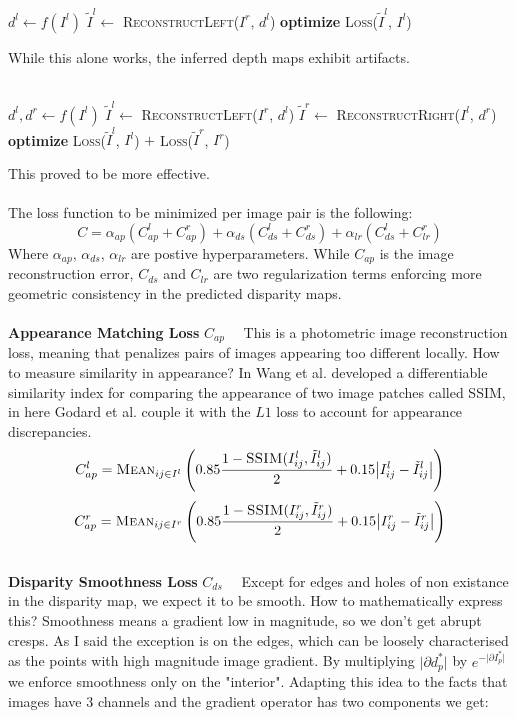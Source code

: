 \begin{algorithmic}
	\State $d^{l} \gets f(I^{l})$ 
	\State $\tilde{I}^{l} \gets$ \textsc{ReconstructLeft}($I^{r}$, $d^{l}$)
	\State \textbf{optimize} \textsc{Loss}($\tilde{I}^{l}$, $I^{l}$)
	\Statex
\end{algorithmic}

While this alone works, the inferred depth maps exhibit artifacts.\\
\\

\begin{algorithmic}
	\State $d^{l}, d^{r} \gets f(I^{l})$ 
	\State $\tilde{I}^{l} \gets$ \textsc{ReconstructLeft}($I^{r}$, $d^{l}$)
	\State $\tilde{I}^{r} \gets$ \textsc{ReconstructRight}($I^{l}$, $d^{r}$)
	\State \textbf{optimize} \textsc{Loss}($\tilde{I}^{l}$, $I^{l}$) $+$ \textsc{Loss}($\tilde{I}^{r}$, $I^{r}$)
	\Statex
\end{algorithmic}
This proved to be more effective.\\
\\
The loss function to be minimized per image pair is the following:
\[
	C = \alpha_{ap}(C_{ap}^{l} + C_{ap}^{r}) +
		\alpha_{ds}(C_{ds}^{l} + C_{ds}^{r}) +
		\alpha_{lr}(C_{ds}^{l} + C_{lr}^{r}) 
\]
Where $\alpha_{ap}$, $\alpha_{ds}$, $\alpha_{lr}$ are postive hyperparameters. While $C_{ap}$ is the image reconstruction error, $C_{ds}$ and $C_{lr}$ are two regularization terms enforcing more geometric consistency in the predicted disparity maps.\\
\\
\textbf{Appearance Matching Loss} $C_{ap} \quad$ This is a photometric image reconstruction loss, meaning that penalizes pairs of images appearing too different locally. How to measure similarity in appearance? In \cite{SSIM} Wang et al. developed a differentiable similarity index for comparing the appearance of two image patches called \textsc{SSIM}, in here Godard et al. couple it with the $L1$ loss to account for appearance discrepancies.
\[
	C_{ap}^{l} = \textsc{Mean}_{ij \in I^{l}}
		\left(
			0.85 \frac{
				1 - \textsc{SSIM} (I^{l}_{ij}, \tilde{I}^{l}_{ij})
			}{2} +
			0.15 \big| I_{ij}^{l} - \tilde{I}_{ij}^{l} \big|
		\right)
\]\[
	C_{ap}^{r} = \textsc{Mean}_{ij \in I^{r}}
		\left(
			0.85 \frac{
				1 - \textsc{SSIM} (I^{r}_{ij}, \tilde{I}^{r}_{ij})
			}{2} +
			0.15 \big| I_{ij}^{r} - \tilde{I}_{ij}^{r} \big|
		\right)
\]
\\
\textbf{Disparity Smoothness Loss} $C_{ds} \quad$ Except for edges and holes of non existance in the disparity map, we expect it to be smooth. How to mathematically express this? Smoothness means a gradient low in magnitude, so we don't get abrupt cresps. As I said the exception is on the edges, which can be loosely characterised as the points with high magnitude image gradient. By multiplying $\big| \partial d^{*}_{p} \big|$ by $e^{- \big| \partial I^{*}_{p} \big| }$ we enforce smoothness only on the "interior". Adapting this idea to the facts that images have 3 channels and the gradient operator has two components we get:
